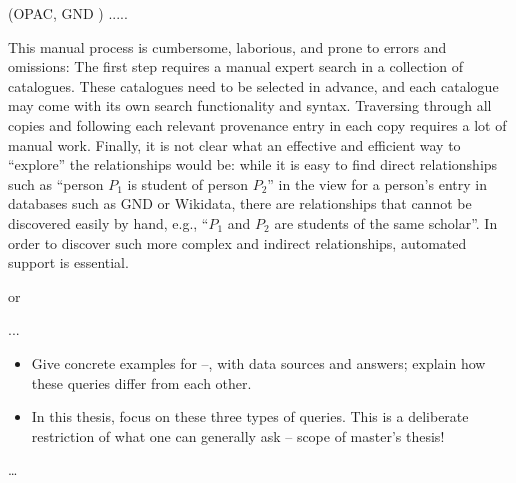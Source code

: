 
(OPAC, GND ) .....

This manual process is cumbersome, laborious, and prone to errors and omissions: The first step
requires a manual expert search in a collection of catalogues. These catalogues need to be selected in advance,
and each catalogue may come with its own search functionality and syntax. 
Traversing through all copies and following each relevant provenance entry in each copy requires
a lot of manual work. 
Finally, it is not clear what an effective and efficient way to ``explore'' the relationships would be:
while it is easy to find direct relationships such as ``person $P_1$ is student of person $P_2$'' in the view for a person's entry
in databases such as GND or Wikidata, there are relationships that cannot be discovered easily by hand,
e.g., ``$P_1$ and $P_2$ are students of the same scholar''.
In order to discover such more complex and indirect relationships, automated support is essential.



or 

...
%
\begin{itemize}
  \item
    Give concrete examples for --, with data sources and answers; explain how these queries differ from each other.
  \item
    In this thesis, focus on these three types of queries.
    This is a deliberate restriction of what one can generally ask – scope of master's thesis!
\end{itemize}



\dots

